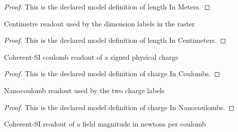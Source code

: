 \begin{proof}
  This is the declared model definition of length In Meters.
\end{proof}
\begin{definition}
  \label{def:physics:phyx-mini-0994:phyxminiproblems-problemphyxmini0994-lengthincentimeters}
  Centimetre readout used by the dimension labels in the raster
\end{definition}
\begin{proof}
  This is the declared model definition of length In Centimeters.
\end{proof}
\begin{definition}
  \label{def:physics:phyx-mini-0994:phyxminiproblems-problemphyxmini0994-chargeincoulombs}
  Coherent-SI coulomb readout of a signed physical charge
\end{definition}
\begin{proof}
  This is the declared model definition of charge In Coulombs.
\end{proof}
\begin{definition}
  \label{def:physics:phyx-mini-0994:phyxminiproblems-problemphyxmini0994-chargeinnanocoulombs}
  Nanocoulomb readout used by the two charge labels
\end{definition}
\begin{proof}
  This is the declared model definition of charge In Nanocoulombs.
\end{proof}
\begin{definition}
  \label{def:physics:phyx-mini-0994:phyxminiproblems-problemphyxmini0994-fieldmagnitudeinnewtonspercoulomb}
  Coherent-SI readout of a field magnitude in newtons per coulomb
\end{definition}

